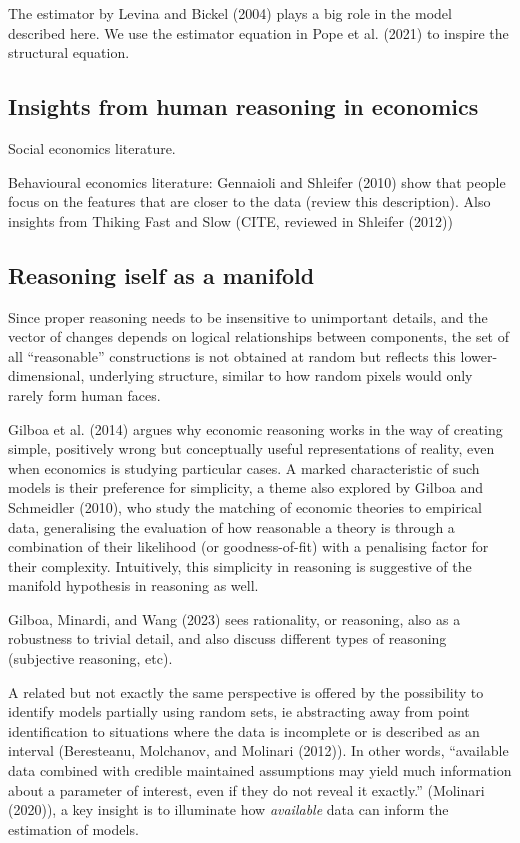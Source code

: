 \documentclass[
]{article}
\begin{document}
The estimator by Levina and Bickel (2004) plays a big role in the model
described here. We use the estimator equation in Pope et al. (2021) to
inspire the structural equation.

\subsection{Insights from human reasoning in
economics}\label{insights-from-human-reasoning-in-economics}

Social economics literature.

Behavioural economics literature: Gennaioli and Shleifer (2010) show
that people focus on the features that are closer to the data (review
this description). Also insights from Thiking Fast and Slow (CITE,
reviewed in Shleifer (2012))

\subsection{Reasoning iself as a
manifold}\label{reasoning-iself-as-a-manifold}

Since proper reasoning needs to be insensitive to unimportant details,
and the vector of changes depends on logical relationships between
components, the set of all ``reasonable'' constructions is not obtained
at random but reflects this lower-dimensional, underlying structure,
similar to how random pixels would only rarely form human faces.

Gilboa et al. (2014) argues why economic reasoning works in the way of
creating simple, positively wrong but conceptually useful
representations of reality, even when economics is studying particular
cases. A marked characteristic of such models is their preference for
simplicity, a theme also explored by Gilboa and Schmeidler (2010), who
study the matching of economic theories to empirical data, generalising
the evaluation of how reasonable a theory is through a combination of
their likelihood (or goodness-of-fit) with a penalising factor for their
complexity. Intuitively, this simplicity in reasoning is suggestive of
the manifold hypothesis in reasoning as well.

Gilboa, Minardi, and Wang (2023) sees rationality, or reasoning, also as
a robustness to trivial detail, and also discuss different types of
reasoning (subjective reasoning, etc).

A related but not exactly the same perspective is offered by the
possibility to identify models partially using random sets, ie
abstracting away from point identification to situations where the data
is incomplete or is described as an interval (Beresteanu, Molchanov, and
Molinari (2012)). In other words, ``available data combined with
credible maintained assumptions may yield much information about a
parameter of interest, even if they do not reveal it exactly.''
(Molinari (2020)), a key insight is to illuminate how \emph{available}
data can inform the estimation of models.
\end{document}
